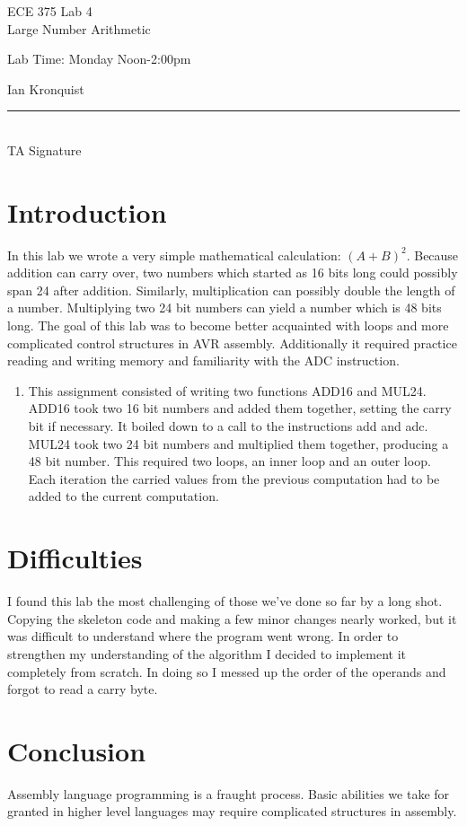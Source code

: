 \documentclass[12pt,letterpaper]{article}
\begin{document}
\begin{titlepage}
    \vspace*{4cm}
    \begin{flushright}
    {\huge
        ECE 375 Lab 4\\[1cm]
    }
    {\large
         Large Number Arithmetic
    }
    \end{flushright}
    \begin{flushleft}
    Lab Time: Monday Noon-2:00pm
    \end{flushleft}
    \begin{flushright}
    Ian Kronquist
    \vfill
    \rule{5in}{.5mm}\\
    TA Signature
    \end{flushright}

\end{titlepage}
\section{Introduction}
In this lab we wrote a very simple mathematical calculation: $(A+B)^{2}$. Because addition can carry over, two numbers which started as 16 bits long could possibly span 24 after addition. Similarly, multiplication can possibly double the length of a number. Multiplying two 24 bit numbers can yield a number which is 48 bits long.
The goal of this lab was to become better acquainted with loops and more complicated control structures in AVR assembly. Additionally it required practice reading and writing memory and familiarity with the ADC instruction.

\begin{enumerate}

\item This assignment consisted of writing two functions ADD16 and MUL24. ADD16 took two 16 bit numbers and added them together, setting the carry bit if necessary. It boiled down to a call to the instructions add and adc. MUL24 took two 24 bit numbers and multiplied them together, producing a 48 bit number. This required two loops, an inner loop and an outer loop. Each iteration the carried values from the previous computation had to be added to the current computation.
\end{enumerate}

\section{Difficulties}
I found this lab the most challenging of those we've done so far by a long shot. Copying the skeleton code and making a few minor changes nearly worked, but it was difficult to understand where the program went wrong. In order to strengthen my understanding of the algorithm I decided to implement it completely from scratch. In doing so I messed up the order of the operands and forgot to read a carry byte.

\section{Conclusion}
Assembly language programming is a fraught process. Basic abilities we take for granted in higher level languages may require complicated structures in assembly.
\end{document}
